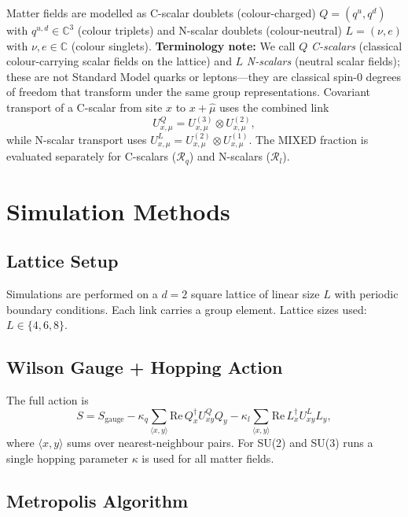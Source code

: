 \documentclass[12pt,a4paper]{article}
\newcommand{\R}{\mathcal{R}}           %
\theoremstyle{plain}
\theoremstyle{definition}
\theoremstyle{remark}
\begin{document}
Matter fields are modelled as C-scalar doublets (colour-charged) $Q=(q^u, q^d)$ with $q^{u,d}\in\mathbb{C}^3$
(colour triplets) and N-scalar doublets (colour-neutral) $L=(\nu,e)$ with $\nu,e\in\mathbb{C}$ (colour
singlets).
\textbf{Terminology note:} We call $Q$ \emph{C-scalars} (classical colour-carrying scalar fields
on the lattice) and $L$ \emph{N-scalars} (neutral scalar fields); these are
not Standard Model quarks or leptons---they are classical spin-0 degrees of freedom
that transform under the same group representations.
Covariant transport of a C-scalar from site $x$ to $x+\hat\mu$ uses the combined link
\begin{equation}
  U^Q_{x,\mu} = U^{(3)}_{x,\mu}\otimes U^{(2)}_{x,\mu},
\end{equation}
while N-scalar transport uses $U^L_{x,\mu} = U^{(2)}_{x,\mu}\otimes U^{(1)}_{x,\mu}$.
The MIXED fraction is evaluated separately for C-scalars ($\R_q$) and N-scalars ($\R_l$).

\section{Simulation Methods}
\label{sec:methods}

\subsection{Lattice Setup}

Simulations are performed on a $d=2$ square lattice of linear size $L$ with
periodic boundary conditions.
Each link carries a group element.
Lattice sizes used: $L\in\{4,6,8\}$.

\subsection{Wilson Gauge + Hopping Action}

The full action is
\begin{equation}
  S = S_\text{gauge} - \kappa_q \sum_{\langle x,y\rangle} \mathrm{Re}\, Q_x^\dagger U^Q_{xy} Q_y
                     - \kappa_l \sum_{\langle x,y\rangle} \mathrm{Re}\, L_x^\dagger U^L_{xy} L_y,
\end{equation}
where $\langle x,y\rangle$ sums over nearest-neighbour pairs.
For SU(2) and SU(3) runs a single hopping parameter $\kappa$ is used for all matter
fields.

\subsection{Metropolis Algorithm}
\end{document}
